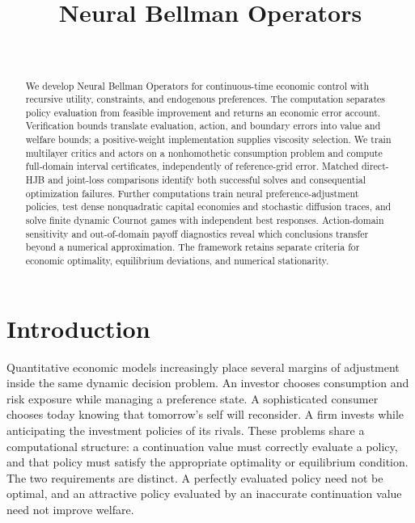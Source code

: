 \documentclass[ecta,draft]{econsocart}
\theoremstyle{definition}
\theoremstyle{remark}
\begin{document}
\begin{frontmatter}
\title{Neural Bellman Operators}
\begin{aug}
\author[id=au1,addressref={add1}]{~}
\address[id=add1]{Peking University}
\end{aug}
\begin{abstract}
We develop Neural Bellman Operators for continuous-time economic control with recursive utility, constraints, and endogenous preferences. The computation separates policy evaluation from feasible improvement and returns an economic error account. Verification bounds translate evaluation, action, and boundary errors into value and welfare bounds; a positive-weight implementation supplies viscosity selection. We train multilayer critics and actors on a nonhomothetic consumption problem and compute full-domain interval certificates, independently of reference-grid error. Matched direct-HJB and joint-loss comparisons identify both successful solves and consequential optimization failures. Further computations train neural preference-adjustment policies, test dense nonquadratic capital economies and stochastic diffusion traces, and solve finite dynamic Cournot games with independent best responses. Action-domain sensitivity and out-of-domain payoff diagnostics reveal which conclusions transfer beyond a numerical approximation. The framework retains separate criteria for economic optimality, equilibrium deviations, and numerical stationarity.
\end{abstract}
\begin{keyword}
\end{keyword}
\end{frontmatter}

\section{Introduction}\label{sec:introduction}
Quantitative economic models increasingly place several margins of adjustment inside the same dynamic decision problem. An investor chooses consumption and risk exposure while managing a preference state. A sophisticated consumer chooses today knowing that tomorrow's self will reconsider. A firm invests while anticipating the investment policies of its rivals. These problems share a computational structure: a continuation value must correctly evaluate a policy, and that policy must satisfy the appropriate optimality or equilibrium condition. The two requirements are distinct. A perfectly evaluated policy need not be optimal, and an attractive policy evaluated by an inaccurate continuation value need not improve welfare.
\end{document}
